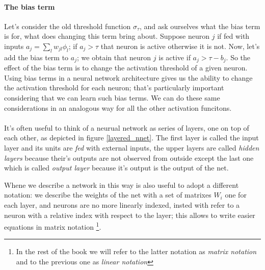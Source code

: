 \paragraph{The bias term}
Let's consider the old threshold function $\sigma_{\tau}$, and ask ourselves what the bias term is for, what does changing this term bring about.
Suppose neuron $j$ if fed with inputs $a_j = \sum_l w_{jl}\phi_l$; if $a_j>\tau$ that neuron is active otherwise it is not. Now, let's add the bias term to $a_j$;
we obtain that neuron $j$ is active if $a_j>\tau-b_j$. So the effect of the bias term is to change the activation threshold of a given neuron. Using bias terms in a neural network architecture gives us
the ability to change the activation threshold for each neuron; that's particularly important considering that we can learn such bias terms.
We can do these same considerations in an analogous way for all the other activation funcitons.
\\\\
It's often useful to think of a neurual network as series of layers, one on top of each other, as depicted in figure \ref{layered_nnet}. The first layer is called the input layer and its units are \textit{fed}
with external inputs, the upper layers are called \textit{hidden layers} because their's outputs are not observed from outside except the last one which is called \textit{output layer} because it's output 
is the output of the net.

Whene we describe a network in this way is also useful to adopt a different notation: we describe the weights of the net with a set of matrixes $W_i$ one for each layer, and neurons are no more
linearly indexed, insted with refer to a neuron with a relative index with respect to the layer; this allows to write easier equations in matrix notation
\footnote{In the rest of the book we will refer to the latter notation as \textsl{matrix notation} and to the previous one as \textsl{linear notation}}.



